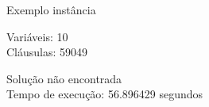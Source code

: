 \documentclass[compress,aspectratio=169]{beamer}
\begin{document}
    \begin{frame}{Exemplo instância}
        \begin{tcolorbox}[title=Entrada da instância, width=\linewidth, fontupper=\ttfamily,  halign=flush left]
            Variáveis: 10 \\
            Cláusulas: 59049
        \end{tcolorbox}
        \begin{tcolorbox}[title=Saída da instância, width=\linewidth, fontupper=\ttfamily, halign=flush left]
            Solução não encontrada \\
            Tempo de execução: 56.896429 segundos
        \end{tcolorbox}
    \end{frame}
\end{document}
